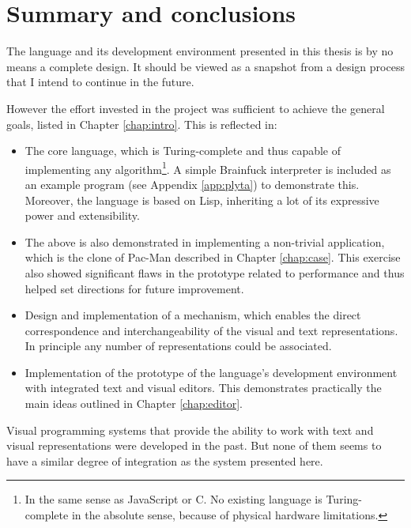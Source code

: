 \chapter{Summary and conclusions}\label{chap:summary}
The language and its development environment presented in this thesis is by no means a complete design. It should be viewed as a snapshot from a design process that I intend to continue in the future.

However the effort invested in the project was sufficient to achieve the general goals, listed in Chapter \ref{chap:intro}. This is reflected in:
\begin{itemize}
    \item The core language, which is Turing-complete and thus capable of implementing any algorithm\footnote{In the same sense as JavaScript or C. No existing language is Turing-complete in the absolute sense, because of physical hardware limitations.}. A simple Brainfuck interpreter is included as an example program (see Appendix \ref{app:plyta}) to demonstrate this\cite{bf_turing_complete}. Moreover, the language is based on Lisp, inheriting a lot of its expressive power and extensibility.
    \item The above is also demonstrated in implementing a non-trivial application, which is the clone of Pac-Man described in Chapter \ref{chap:case}. This exercise also showed significant flaws in the prototype related to performance and thus helped set directions for future improvement.
    \item Design and implementation of a mechanism, which enables the direct correspondence and interchangeability of the visual and text representations. In principle any number of representations could be associated.
    \item Implementation of the prototype of the language's development
    environment with integrated text and visual editors. This demonstrates practically the main ideas outlined in Chapter \ref{chap:editor}.
\end{itemize}

Visual programming systems that provide the ability to work with text and visual representations were developed in the past\cite{snapshots}. But none of them seems to have a similar degree of integration as the system presented here.

